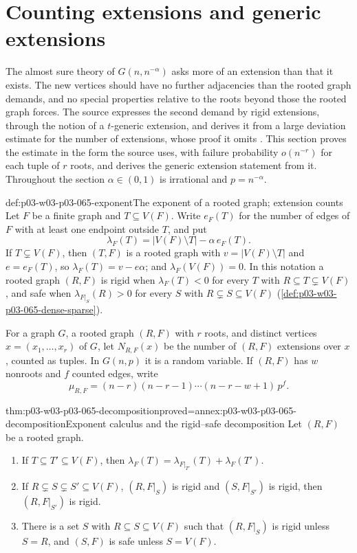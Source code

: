 \section{Counting extensions and generic extensions}
\label{sec:p03-w03-p03-065-counting}

The almost sure theory of \(G(n,n^{-\alpha})\) asks more of an extension
than that it exists.  The new vertices should have no further adjacencies
than the rooted graph demands, and no special properties relative to the
roots beyond those the rooted graph forces.  The source expresses the second
demand by rigid extensions, through the notion of a \(t\)-generic extension,
and derives it from a large deviation estimate for the number of extensions,
whose proof it omits \cite[pp.~10--11]{Spencer2007LogicRandomStructuresAuthor}.
This section proves the estimate in the form the source uses, with failure
probability \(o(n^{-r})\) for each tuple of \(r\) roots, and derives the
generic extension statement from it.  Throughout the section
\(\alpha\in(0,1)\) is irrational and \(p=n^{-\alpha}\).

\begin{hbdefinition}{def:p03-w03-p03-065-exponent}{The exponent of a rooted graph; extension counts}
Let \(F\) be a finite graph and \(T\subseteq V(F)\).  Write \(e_F(T)\) for
the number of edges of \(F\) with at least one endpoint outside \(T\), and
put
\[
  \lambda_F(T)=|V(F)\setminus T|-\alpha\,e_F(T).
\]
If \(T\subsetneq V(F)\), then \((T,F)\) is a rooted graph with
\(v=|V(F)\setminus T|\) and \(e=e_F(T)\), so \(\lambda_F(T)=v-e\alpha\); and
\(\lambda_F(V(F))=0\).  In this notation a rooted graph \((R,F)\) is rigid
when \(\lambda_F(T)<0\) for every \(T\) with \(R\subseteq T\subsetneq V(F)\),
and safe when \(\lambda_{F|_S}(R)>0\) for every \(S\) with
\(R\subsetneq S\subseteq V(F)\) (\cref{def:p03-w03-p03-065-dense-sparse}).

For a graph \(G\), a rooted graph \((R,F)\) with \(r\) roots, and distinct
vertices \(x=(x_1,\ldots,x_r)\) of \(G\), let \(N_{R,F}(x)\) be the number of
\((R,F)\) extensions over \(x\), counted as tuples.  In \(G(n,p)\) it is a
random variable.  If \((R,F)\) has \(w\) nonroots and \(f\) counted edges,
write
\[
  \mu_{R,F}=(n-r)(n-r-1)\cdots(n-r-w+1)\,p^{f}.
\]
\end{hbdefinition}

\begin{hblemma}{thm:p03-w03-p03-065-decomposition}{proved=annex:p03-w03-p03-065-decomposition}{Exponent calculus and the rigid--safe decomposition}
Let \((R,F)\) be a rooted graph.
\begin{enumerate}
\item If \(T\subseteq T'\subseteq V(F)\), then
  \(\lambda_F(T)=\lambda_{F|_{T'}}(T)+\lambda_F(T')\).
\item If \(R\subsetneq S\subsetneq S'\subseteq V(F)\), \((R,F|_S)\) is rigid
  and \((S,F|_{S'})\) is rigid, then \((R,F|_{S'})\) is rigid.
\item There is a set \(S\) with \(R\subseteq S\subseteq V(F)\) such that
  \((R,F|_S)\) is rigid unless \(S=R\), and \((S,F)\) is safe unless
  \(S=V(F)\).
\end{enumerate}
\end{hblemma}

